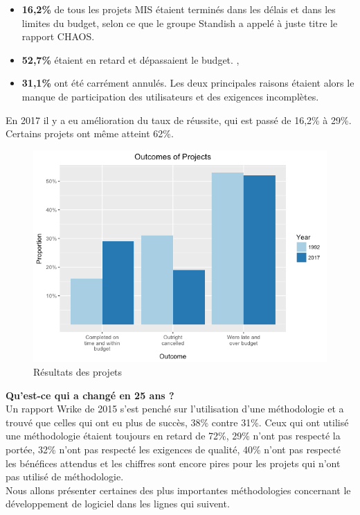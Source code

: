 \documentclass[a4paper, 12pt]{report}
\begin{document}
\begin{itemize}
  \item \textbf{16,2\%} de tous les projets MIS étaient terminés dans les délais et dans les limites du budget, selon ce que le groupe Standish a appelé à juste titre le rapport CHAOS.  
  \item \textbf{52,7\%} étaient en retard et dépassaient le budget. ,
  \item \textbf{31,1\%} ont été carrément annulés. Les deux principales raisons étaient alors le manque de participation des utilisateurs et des exigences incomplètes. 
\end{itemize} 

En 2017 il y a eu amélioration du taux de réussite, qui est passé de 16,2\% à 29\%. Certains projets ont même atteint 62\%.  

\begin{figure}[!h]
\centering
\includegraphics[width = 1\linewidth]{img/outcome-of-projects.png}
\caption{Résultats des projets}
\end{figure}

\textbf{Qu’est-ce qui a changé en 25 ans ?} \\
Un rapport Wrike de 2015 s'est penché sur l'utilisation d'une méthodologie et a trouvé que celles qui ont eu plus de succès, 38\% contre 31\%.  Ceux qui ont utilisé une méthodologie étaient toujours en retard de 72\%, 29\% n'ont pas respecté la portée, 32\% n'ont pas respecté les exigences de qualité, 40\% n'ont pas respecté les bénéfices attendus et les chiffres sont encore pires pour les projets qui n'ont pas utilisé de méthodologie.\\
Nous allons présenter certaines des plus importantes méthodologies concernant le développement de logiciel dans les lignes qui suivent. 
\end{document}

